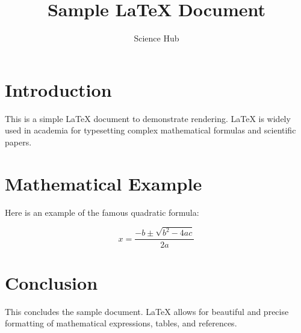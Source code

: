 \documentclass{article}
\title{Sample LaTeX Document}
\author{Science Hub}
\begin{document}
\maketitle

\section{Introduction}
This is a simple LaTeX document to demonstrate rendering. LaTeX is widely used in academia for typesetting complex mathematical formulas and scientific papers.

\section{Mathematical Example}
Here is an example of the famous quadratic formula:

\[
x = \frac{-b \pm \sqrt{b^2 - 4ac}}{2a}
\]

\section{Conclusion}
This concludes the sample document. LaTeX allows for beautiful and precise formatting of mathematical expressions, tables, and references.
\end{document}
